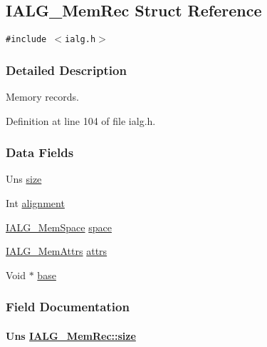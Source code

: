 \hypertarget{struct_i_a_l_g___mem_rec}{
\subsection{IALG\_\-Mem\-Rec Struct Reference}
\label{struct_i_a_l_g___mem_rec}
}
{\tt \#include $<$ialg.h$>$}



\subsubsection{Detailed Description}
Memory records. 



Definition at line 104 of file ialg.h.\subsubsection*{Data Fields}
\begin{CompactItemize}
\item 
Uns \hyperlink{struct_i_a_l_g___mem_rec_6d4138068c5a30b4399464f5a8e3aca2}{size}
\item 
Int \hyperlink{struct_i_a_l_g___mem_rec_86daec3754a4b918fff07efe28461748}{alignment}
\item 
\hyperlink{group__ti__xdais___i_a_l_g_g262eb64dc7343999fa07d535ae163497}{IALG\_\-Mem\-Space} \hyperlink{struct_i_a_l_g___mem_rec_41e307f25d01a4329f4f4bd794c9087c}{space}
\item 
\hyperlink{group__ti__xdais___i_a_l_g_g805f1c1330403c05633277a073862e3d}{IALG\_\-Mem\-Attrs} \hyperlink{struct_i_a_l_g___mem_rec_a9dca3a637dc7e26069f4a11e7c82593}{attrs}
\item 
Void $\ast$ \hyperlink{struct_i_a_l_g___mem_rec_2a51de211c96021ca4aa360e352aa90f}{base}
\end{CompactItemize}


\subsubsection{Field Documentation}
\hypertarget{struct_i_a_l_g___mem_rec_6d4138068c5a30b4399464f5a8e3aca2}{
\paragraph[size]{\setlength{\rightskip}{0pt plus 5cm}Uns \hyperlink{struct_i_a_l_g___mem_rec_6d4138068c5a30b4399464f5a8e3aca2}{IALG\_\-Mem\-Rec::size}}\hfill}
\label{struct_i_a_l_g___mem_rec_6d4138068c5a30b4399464f5a8e3aca2}


